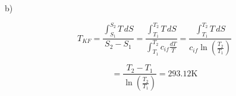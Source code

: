 b)

\[
T_{KF} = \frac{\int_{S_1}^{S_2} T \, dS}{S_2 - S_1} = \frac{\int_{T_1}^{T_2} T \, dS}{\int_{T_1}^{T_2} c_{if} \frac{dT}{T}} = \frac{\int_{T_1}^{T_2} T \, dS}{c_{if} \ln \left( \frac{T_2}{T_1} \right)}
\]

\[
= \frac{T_2 - T_1}{\ln \left( \frac{T_2}{T_1} \right)} = 293.12 \text{K}
\]